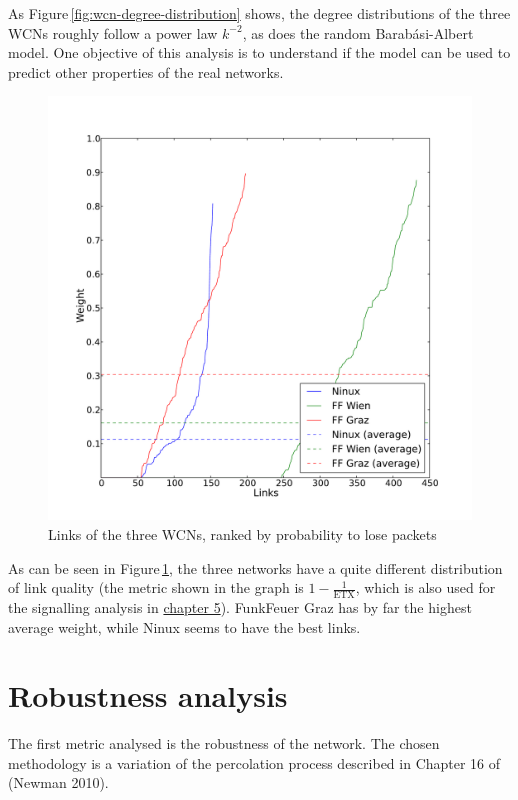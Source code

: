 \documentclass[oneside,openany]{memoir}
\newcommand{\figref}[1] {Figure\,\ref{#1}}
\newcommand{\etx}{\mathrm{ETX}}
\begin{document}
\FloatBarrier
As \figref{fig:wcn-degree-distribution} shows, the degree distributions of the three WCNs
roughly follow a power law $k^{-2}$, as does the random Barabási-Albert
model. One objective of this analysis is to understand if the model can
be used to predict other properties of the real networks.

\newpage
\begin{figure}[htb]
\centering
\includegraphics{graphs/weight_rank.pdf}
\caption{Links of the three WCNs, ranked by probability to lose packets}
\label{fig:wcn-link-ranking}
\end{figure}

\FloatBarrier
As can be seen in \figref{fig:wcn-link-ranking}, the three networks have a quite
different distribution of link quality (the metric shown in the graph is
$1 - \frac{1}{\etx}$, which is also used for the signalling analysis in
\hyperref[message-propagation-analysis]{chapter 5}). FunkFeuer Graz has by far the highest average
weight, while Ninux seems to have the best links.

\chapter{Robustness analysis}\label{robustness-analysis}

The first metric analysed is the robustness of the network. The chosen
methodology is a variation of the percolation process described in
Chapter 16 of (Newman 2010).
\end{document}
